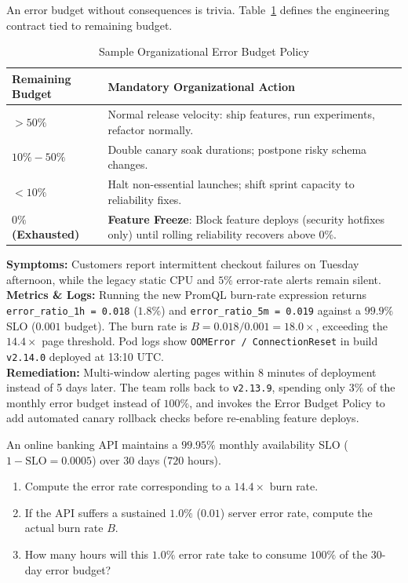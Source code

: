 An error budget without consequences is trivia. Table~\ref{tab:v5-ch05-budget-policy} defines the engineering contract tied to remaining budget.

\begin{table}[htbp]
\centering\small
\begin{tabular}{lp{10.5cm}}
\toprule
\textbf{Remaining Budget} & \textbf{Mandatory Organizational Action} \\
\midrule
\textbf{$> 50\%$} & Normal release velocity: ship features, run experiments, refactor normally. \\
\textbf{$10\% - 50\%$} & Double canary soak durations; postpone risky schema changes. \\
\textbf{$< 10\%$} & Halt non-essential launches; shift sprint capacity to reliability fixes. \\
\textbf{$0\%$ (Exhausted)} & \textbf{Feature Freeze}: Block feature deploys (security hotfixes only) until rolling reliability recovers above $0\%$. \\
\bottomrule
\end{tabular}
\caption{Sample Organizational Error Budget Policy}
\label{tab:v5-ch05-budget-policy}
\end{table}

\begin{realworldbox}
\textbf{Symptoms:} Customers report intermittent checkout failures on Tuesday afternoon, while the legacy static CPU and $5\%$ error-rate alerts remain silent.\\
\textbf{Metrics \& Logs:} Running the new PromQL burn-rate expression returns \texttt{error\_ratio\_1h = 0.018} ($1.8\%$) and \texttt{error\_ratio\_5m = 0.019} against a $99.9\%$ SLO ($0.001$ budget). The burn rate is $B = 0.018 / 0.001 = 18.0\times$, exceeding the $14.4\times$ page threshold. Pod logs show \texttt{OOMError / ConnectionReset} in build \texttt{v2.14.0} deployed at 13:10 UTC.\\
\textbf{Remediation:} Multi-window alerting pages within 8 minutes of deployment instead of 5 days later. The team rolls back to \texttt{v2.13.9}, spending only $3\%$ of the monthly error budget instead of $100\%$, and invokes the Error Budget Policy to add automated canary rollback checks before re-enabling feature deploys.
\end{realworldbox}

\begin{tryityourselfbox}
An online banking API maintains a $99.95\%$ monthly availability SLO ($1 - \text{SLO} = 0.0005$) over 30 days ($720\text{ hours}$).
\begin{enumerate}
  \item Compute the error rate corresponding to a $14.4\times$ burn rate.
  \item If the API suffers a sustained $1.0\%$ ($0.01$) server error rate, compute the actual burn rate $B$.
  \item How many hours will this $1.0\%$ error rate take to consume $100\%$ of the 30-day error budget?
\end{enumerate}
\end{tryityourselfbox}

